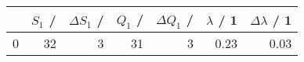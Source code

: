 \begin{tabular}{lrrrrrr}
	\toprule
	{} & $S_1$ / \si{\va} & $\Delta S_1$ / \si{\va} & $Q_1$ / \si{\var} & $\Delta Q_1$ / \si{\var} & $\lambda$ / 1 & $\Delta \lambda$ / 1 \\
	\midrule
	0  & 32               & 3                       & 31                & 3                        & 0.23          & 0.03                 \\
	\bottomrule
\end{tabular}
